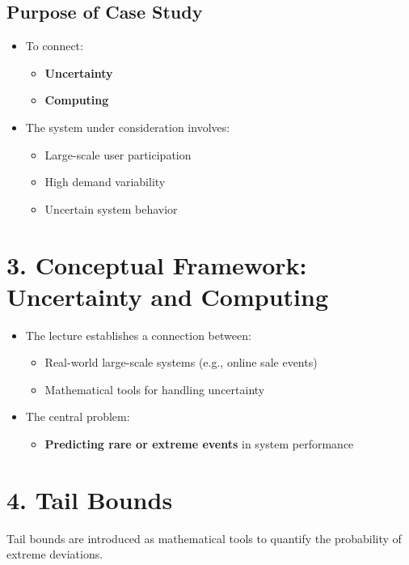 \documentclass[12pt]{article}
\begin{document}
\subsection*{Purpose of Case Study}

\begin{itemize}
    \item To connect:
    \begin{itemize}
        \item \textbf{Uncertainty}
        \item \textbf{Computing}
    \end{itemize}
    \item The system under consideration involves:
    \begin{itemize}
        \item Large-scale user participation  
        \item High demand variability  
        \item Uncertain system behavior  
    \end{itemize}
\end{itemize}

\section*{3. Conceptual Framework: Uncertainty and Computing}

\begin{itemize}
    \item The lecture establishes a connection between:
    \begin{itemize}
        \item Real-world large-scale systems (e.g., online sale events)
        \item Mathematical tools for handling uncertainty  
    \end{itemize}
    \item The central problem:
    \begin{itemize}
        \item \textbf{Predicting rare or extreme events} in system performance  
    \end{itemize}
\end{itemize}

\section*{4. Tail Bounds}

Tail bounds are introduced as mathematical tools to quantify the probability of extreme deviations.
\end{document}

